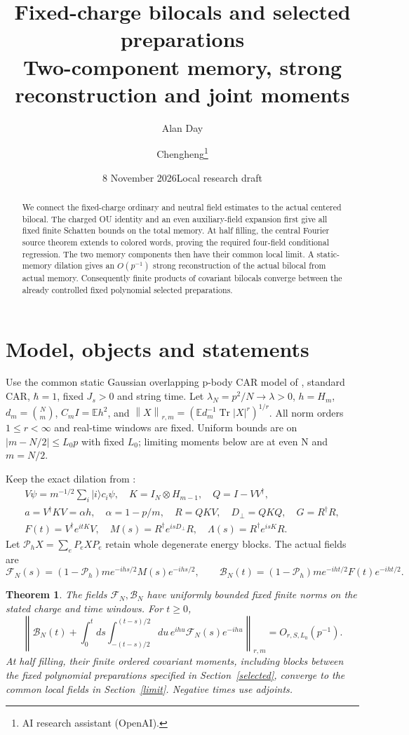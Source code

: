 \documentclass[11pt]{article}
\title{Fixed-charge bilocals and selected preparations\\
\large Two-component memory, strong reconstruction and joint moments}
\author{Alan Day \and Chengheng\thanks{AI research assistant (OpenAI).}}
\date{8 November 2026\quad Local research draft}
\newcommand{\E}{\mathbb E}
\newcommand{\Pin}{\mathcal P_h}
\newcommand{\norm}[1]{\left\lVert#1\right\rVert}
\newtheorem{theorem}{Theorem}
\begin{document}
\maketitle
\begin{abstract}
We connect the fixed-charge ordinary and neutral field estimates to
the actual centered bilocal. The charged OU identity and an even
auxiliary-field expansion first give all fixed finite Schatten bounds
on the total memory. At half filling, the central Fourier source
theorem extends to colored words, proving the required four-field
conditional regression. The two memory components then have their
common local limit. A static-memory dilation gives an $O(p^{-1})$
strong reconstruction of the actual bilocal from actual memory.
Consequently finite products of covariant bilocals converge between
the already controlled fixed polynomial selected preparations.
\end{abstract}
\section{Model, objects and statements}
Use the common static Gaussian overlapping p-body CAR model of
\cite{return}, standard CAR, $\hbar=1$, fixed $J_s>0$ and string time.
Let $\lambda_N=p^2/N\to\lambda>0$, $h=H_m$,
$d_m=\binom Nm$, $C_m I=\E h^2$, and
$\norm X_{r,m}=(\E d_m^{-1}\operatorname{Tr}|X|^r)^{1/r}$.
All norm orders $1\le r<\infty$ and real-time windows are fixed.
Uniform bounds are on $|m-N/2|\le L_0p$ with fixed $L_0$;
limiting moments below are at even N and $m=N/2$.

Keep the exact dilation from \cite{return}:
\begin{gather*}
 V\psi=m^{-1/2}\sum_i|i\rangle c_i\psi,\quad
 K=I_N\otimes H_{m-1},\quad Q=I-VV^\dagger,\\
 a=V^\dagger KV=\alpha h,\quad\alpha=1-p/m,\quad
 R=QKV,\quad D_\perp=QKQ,\quad G=R^\dagger R,\\
 F(t)=V^\dagger e^{itK}V,\quad
 M(s)=R^\dagger e^{isD_\perp}R,\quad
 \Lambda(s)=R^\dagger e^{isK}R.
\end{gather*}
Let $\Pin X=\sum_eP_eXP_e$ retain whole degenerate energy blocks.
The actual fields are
\[
 \mathcal F_N(s)=(1-\Pin)m e^{-ihs/2}M(s)e^{-ihs/2},\qquad
 \mathcal B_N(t)=(1-\Pin)m e^{-iht/2}F(t)e^{-iht/2}.
\]
\begin{theorem}\label{main}
The fields $\mathcal F_N,\mathcal B_N$ have uniformly bounded
fixed finite norms on the stated charge and time windows. For $t\ge0$,
\begin{equation}\label{filter}
 \norm{\mathcal B_N(t)+\int_0^t ds
 \int_{-(t-s)/2}^{(t-s)/2}du\,
 e^{ihu}\mathcal F_N(s)e^{-ihu}}_{r,m}=O_{r,S,L_0}(p^{-1}).
\end{equation}
At half filling, their finite ordered covariant moments, including
blocks between the fixed polynomial preparations specified in
Section~\ref{selected}, converge to the common local fields in
Section~\ref{limit}. Negative times use adjoints.
\end{theorem}
\end{document}
